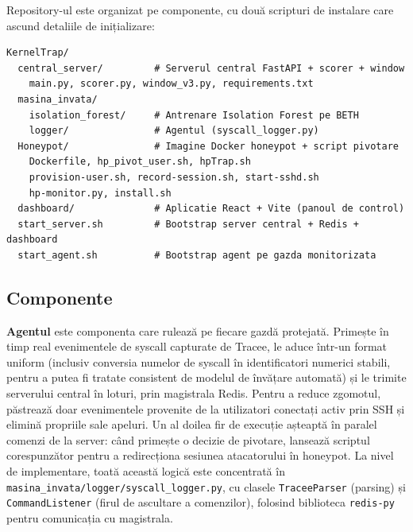 Repository-ul este organizat pe componente, cu două scripturi de instalare 
care ascund detaliile de inițializare:

\begin{lstlisting}[caption={Structura repository-ului (esențială)}, label={lst:cap5-tree}]
KernelTrap/
  central_server/         # Serverul central FastAPI + scorer + window
    main.py, scorer.py, window_v3.py, requirements.txt
  masina_invata/
    isolation_forest/     # Antrenare Isolation Forest pe BETH
    logger/               # Agentul (syscall_logger.py)
  Honeypot/               # Imagine Docker honeypot + script pivotare
    Dockerfile, hp_pivot_user.sh, hpTrap.sh
    provision-user.sh, record-session.sh, start-sshd.sh
    hp-monitor.py, install.sh
  dashboard/              # Aplicatie React + Vite (panoul de control)
  start_server.sh         # Bootstrap server central + Redis + dashboard
  start_agent.sh          # Bootstrap agent pe gazda monitorizata
\end{lstlisting}

\subsection{Componente}

\textbf{Agentul} este componenta care rulează pe fiecare gazdă protejată.
Primește în timp real evenimentele de syscall capturate de Tracee, le aduce
într-un format uniform (inclusiv conversia numelor de syscall în identificatori
numerici stabili, pentru a putea fi tratate consistent de modelul de
învățare automată) și le trimite serverului central în loturi, prin magistrala
Redis. Pentru a reduce zgomotul, păstrează doar evenimentele provenite de la
utilizatori conectați activ prin SSH și elimină propriile sale apeluri.
Un al doilea fir de execuție așteaptă în paralel comenzi de la server: când
primește o decizie de pivotare, lansează scriptul corespunzător pentru a
redirecționa sesiunea atacatorului în honeypot. La nivel de implementare,
toată această logică este concentrată în
\texttt{masina\_invata/logger/syscall\_logger.py}, cu clasele
\texttt{TraceeParser} (parsing) și \texttt{CommandListener} (firul de
ascultare a comenzilor), folosind biblioteca \texttt{redis-py} pentru
comunicația cu magistrala.

